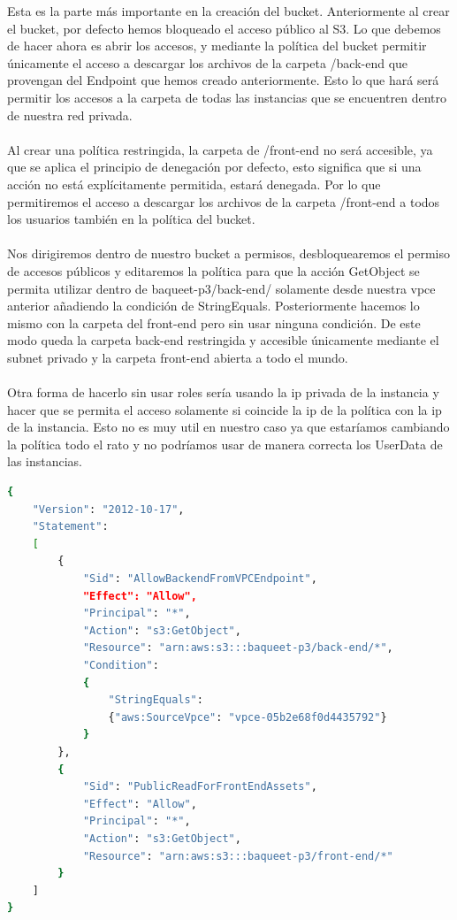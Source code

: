 \documentclass{article}
\begin{document}
	Esta es la parte más importante en la creación del bucket. Anteriormente al crear el bucket, por defecto hemos bloqueado el acceso público al S3. Lo que debemos de hacer ahora es abrir los accesos, y mediante la política del bucket permitir únicamente el acceso a descargar los archivos de la carpeta /back-end que provengan del Endpoint que hemos creado anteriormente. Esto lo que hará será permitir los accesos a la carpeta de todas las instancias que se encuentren dentro de nuestra red privada. 
	\\\\
	Al crear una política restringida, la carpeta de /front-end no será accesible, ya que se aplica el principio de denegación por defecto, esto significa que si una acción no está explícitamente permitida, estará denegada. Por lo que permitiremos el acceso a descargar los archivos de la carpeta /front-end a todos los usuarios también en la política del bucket.
	\\\\
	Nos dirigiremos dentro de nuestro bucket a permisos, desbloquearemos el permiso de accesos públicos y editaremos la política para que la acción GetObject se permita utilizar dentro de baqueet-p3/back-end/ solamente desde nuestra vpce anterior añadiendo la condición de StringEquals. Posteriormente hacemos lo mismo con la carpeta del front-end pero sin usar ninguna condición. De este modo queda la carpeta back-end restringida y accesible únicamente mediante el subnet privado y la carpeta front-end abierta a todo el mundo.
	\\\\
	Otra forma de hacerlo sin usar roles sería usando la ip privada de la instancia y hacer que se permita el acceso solamente si coincide la ip de la política con la ip de la instancia. Esto no es muy util en nuestro caso ya que estaríamos cambiando la política todo el rato y no podríamos usar de manera correcta los UserData de las instancias.


	

	\begin{lstlisting}[style=consola, language=bash, caption={política-s3.json}]
{
    "Version": "2012-10-17",
    "Statement": 
    [
        {
            "Sid": "AllowBackendFromVPCEndpoint",
            "Effect": "Allow",
            "Principal": "*",
            "Action": "s3:GetObject",
            "Resource": "arn:aws:s3:::baqueet-p3/back-end/*",
            "Condition": 
            {
                "StringEquals": 
				{"aws:SourceVpce": "vpce-05b2e68f0d4435792"}
            }
        },
        {
            "Sid": "PublicReadForFrontEndAssets",
            "Effect": "Allow",
            "Principal": "*",
            "Action": "s3:GetObject",
            "Resource": "arn:aws:s3:::baqueet-p3/front-end/*"
        }
    ]
}\end{lstlisting}
\end{document}
